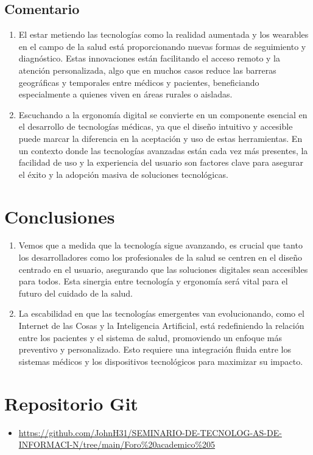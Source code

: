 \documentclass[12pt]{article}
\begin{document}
\subsection*{Comentario}
\begin{enumerate}
    \item El estar metiendo las tecnologías como la realidad aumentada y los wearables en el campo de la salud está proporcionando nuevas formas de seguimiento y diagnóstico. Estas innovaciones están facilitando el acceso remoto y la atención personalizada, algo que en muchos casos reduce las barreras geográficas y temporales entre médicos y pacientes, beneficiando especialmente a quienes viven en áreas rurales o aisladas.
    \item Escuchando a la ergonomía digital se convierte en un componente esencial en el desarrollo de tecnologías médicas, ya que el diseño intuitivo y accesible puede marcar la diferencia en la aceptación y uso de estas herramientas. En un contexto donde las tecnologías avanzadas están cada vez más presentes, la facilidad de uso y la experiencia del usuario son factores clave para asegurar el éxito y la adopción masiva de soluciones tecnológicas.
\end{enumerate}

\section*{Conclusiones}
\begin{enumerate}
    \item Vemos que a medida que la tecnología sigue avanzando, es crucial que tanto los desarrolladores como los profesionales de la salud se centren en el diseño centrado en el usuario, asegurando que las soluciones digitales sean accesibles para todos. Esta sinergia entre tecnología y ergonomía será vital para el futuro del cuidado de la salud.
    \item La escabilidad en que las tecnologías emergentes van evolucionando, como el Internet de las Cosas y la Inteligencia Artificial, está redefiniendo la relación entre los pacientes y el sistema de salud, promoviendo un enfoque más preventivo y personalizado. Esto requiere una integración fluida entre los sistemas médicos y los dispositivos tecnológicos para maximizar su impacto.


\end{enumerate}




\section*{Repositorio Git}
\begin{itemize}
    \item \url{https://github.com/JohnH31/SEMINARIO-DE-TECNOLOG-AS-DE-INFORMACI-N/tree/main/Foro%20academico%205}
\end{itemize}
\end{document}
